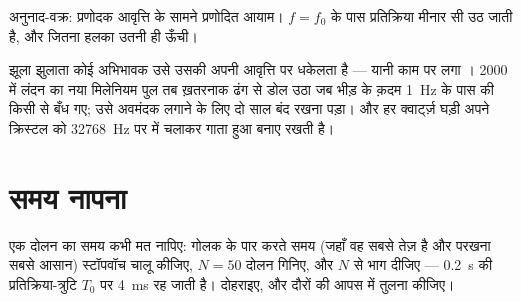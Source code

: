 \begin{omfigure}

{\small अनुनाद-वक्र: प्रणोदक आवृत्ति के सामने प्रणोदित
आयाम। $f = f_0$ के पास प्रतिक्रिया मीनार सी उठ जाती है, और
 जितना हलका उतनी ही ऊँची।}
\end{omfigure}

\begin{example}[अनुनाद, भले के लिए और बुरे के लिए]\label{ex:g12:oscillators-and-time:resonance-zoo}
झूला झुलाता कोई अभिभावक उसे उसकी अपनी आवृत्ति पर धकेलता है --- यानी
काम पर लगा । \num{2000} में लंदन का नया मिलेनियम पुल तब
ख़तरनाक ढंग से डोल उठा जब भीड़ के क़दम \qty{1}{Hz} के पास की किसी  से बँध गए; उसे अवमंदक लगाने के लिए दो साल बंद रखना पड़ा। और हर
क्वार्ट्ज़ घड़ी अपने क्रिस्टल को \qty{32768}{Hz} पर  में चलाकर गाता हुआ
बनाए रखती है।
\end{example}

\section{समय नापना}

\begin{method}[आवर्तकाल नापना]\label{met:g12:oscillators-and-time:timing}
एक दोलन का समय कभी मत नापिए: गोलक के  पार करते समय (जहाँ वह सबसे तेज़
है और परखना सबसे आसान) स्टॉपवॉच चालू कीजिए, $N = 50$ दोलन गिनिए, और $N$ से
भाग दीजिए --- \qty{0.2}{s} की प्रतिक्रिया-त्रुटि $T_0$ पर \qty{4}{ms} रह जाती है।
दोहराइए, और दौरों की आपस में तुलना कीजिए।
\end{method}

